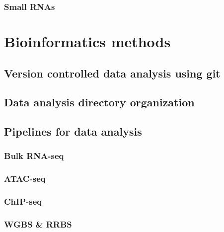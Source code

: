 \documentclass[12pt,twoside]{reedthesis}
\begin{document}
\hypertarget{small-rnas}{%
\subsection{Small RNAs}\label{small-rnas}}

\hypertarget{methods}{%
\chapter*{Bioinformatics methods}\label{methods}}

\hypertarget{version-controlled-data-analysis-using-git}{%
\section{Version controlled data analysis using git}\label{version-controlled-data-analysis-using-git}}

\hypertarget{data-analysis-directory-organization}{%
\section{Data analysis directory organization}\label{data-analysis-directory-organization}}

\hypertarget{pipelines-for-data-analysis}{%
\section{Pipelines for data analysis}\label{pipelines-for-data-analysis}}

\hypertarget{bulk-rna-seq}{%
\subsection{Bulk RNA-seq}\label{bulk-rna-seq}}

\hypertarget{atac-seq}{%
\subsection{ATAC-seq}\label{atac-seq}}

\hypertarget{chip-seq}{%
\subsection{ChIP-seq}\label{chip-seq}}

\hypertarget{wgbs-rrbs}{%
\subsection{WGBS \& RRBS}\label{wgbs-rrbs}}
\end{document}
